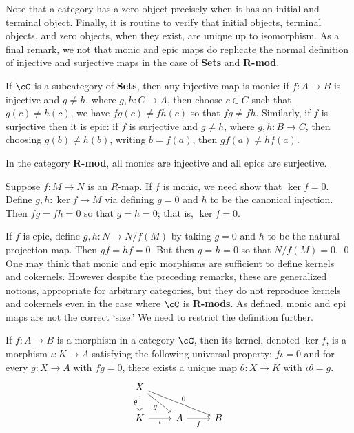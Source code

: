 Note that a category has a zero object precisely when it has an initial and terminal object. Finally, it is routine to verify that initial objects, terminal objects, and zero objects, when they exist, are unique up to isomorphism. As a final remark, we not that monic and epic maps do replicate the normal definition of injective and surjective maps in the case of \textbf{Sets} and \textbf{R-mod}.


\begin{ex}
If $\cC$ is a subcategory of \textbf{Sets}, then any injective map is monic: if $f: A \to B$ is injective and $g \neq h$, where $g,h: C \to A$, then choose $c \in C$ such that $g(c) \neq h(c)$, we have $fg(c)\neq fh(c)$ so that $fg \neq fh$. Similarly, if $f$ is surjective then it is epic: if $f$ is surjective and $g \neq h$, where $g,h: B \to C$, then choosing $g(b) \neq h(b)$, writing $b=f(a)$, then $gf(a) \neq hf(a)$. \xqed
\end{ex}


\begin{prop}
In the category \textbf{R-mod}, all monics are injective and all epics are surjective.
\end{prop}

\pf Suppose $f: M \to N$ is an $R$-map. If $f$ is monic, we need show that $\ker f=0$. Define $g,h: \ker f \to M$ via defining $g=0$ and $h$ to be the canonical injection. Then $fg=fh=0$ so that $g=h=0$; that is, $\ker f=0$. 

If $f$ is epic, define $g,h: N \to N/f(M)$ by taking $g=0$ and $h$ to be the natural projection map. Then $gf=hf=0$. But then $g=h=0$ so that $N/f(M)=0$. \qed \\


One may think that monic and epic morphisms are sufficient to define kernels and cokernels. However despite the preceding remarks, these are generalized notions, appropriate for arbitrary categories, but they do not reproduce kernels and cokernels even in the case where $\cC$ is \textbf{R-mods}. As defined, monic and epi maps are not the correct `size.' We need to restrict the definition further. 


\begin{dfn}[Kernel]
If $f: A \to B$ is a morphism in a category $\cC$, then its kernel, denoted $\ker f$, is a morphism $\iota: K \to A$ satisfying the following universal property: $f\iota=0$ and for every $g: X \to A$ with $fg=0$, there exists a unique map $\theta: X \to K$ with $\iota\theta=g$.
	\[
	\begin{tikzcd}
	X \arrow[dotted,swap]{d}{\theta} \arrow[swap]{dr}{g} \arrow{drr}{0} & & \\
	K \arrow[swap]{r}{\iota} & A \arrow[swap]{r}{f} & B 
	\end{tikzcd}
	\]
\end{dfn}


